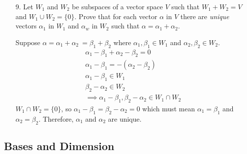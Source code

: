 \documentclass{article}
\begin{document}
\begin{enumerate}[listparindent=\parindent]
\item[9.] Let \(W_1\) and \(W_2\) be subspaces of a vector space \(V\) such that \(W_1 + W_2 = V\)
    and \(W_1 \cup W_2 = \{0\}\). Prove that for each vector \(\alpha\) in \(V\) there are
    \textit{unique} vectors \(\alpha_1\) in \(W_1\) and \(\alpha_w\) in \(W_2\) such that \(\alpha = \alpha_1 + \alpha_2\).

    Suppose \(\alpha = \alpha_1 + \alpha_2\ = \beta_1 + \beta_2\) where \(\alpha_1, \beta_1 \in W_1\) and \(\alpha_2, \beta_2 \in W_2\).
    \begin{gather*}
        \alpha_1 - \beta_1 + \alpha_2 - \beta_2 = 0 \\
        \alpha_1 - \beta_1 = -(\alpha_2 - \beta_2) \\
        \alpha_1 - \beta_1 \in W_1 \\
        \beta_2 - \alpha_2 \in W_2 \\
        \implies \alpha_1 - \beta_1, \beta_2 - \alpha_2 \in W_1 \cap W_2
    \end{gather*}
    \(W_1 \cap W_2 = \{0\}\), so \(\alpha_1 - \beta_1 = \beta_2 - \alpha_2 = 0\)
    which must mean \(\alpha_1 = \beta_1\) and \(\alpha_2 = \beta_2\). 
    Therefore, \(\alpha_1\) and \(\alpha_2\) are unique.
\end{enumerate}

\subsection{Bases and Dimension}
\begin{enumerate}[listparindent=\parindent]
\end{enumerate}
\end{document}
